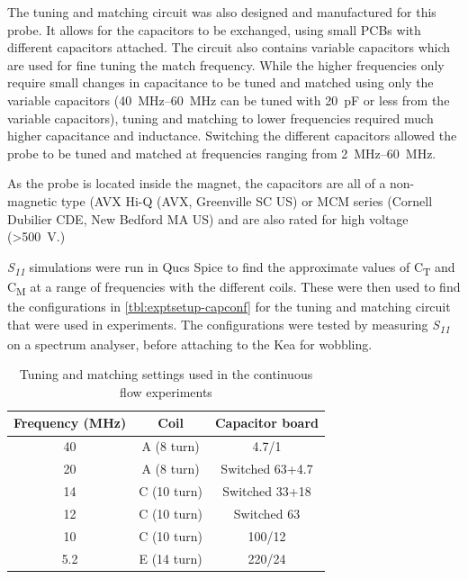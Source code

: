 The tuning and matching circuit was also designed and manufactured for this probe.
It allows for the capacitors to be exchanged, using small PCBs with different capacitors attached.
The circuit also contains variable capacitors which are used for fine tuning the match frequency.
While the higher frequencies only require small changes in capacitance to be tuned and matched using only the variable capacitors (\SIrange[range-phrase = --]{40}{60}{MHz} can be tuned with \SI{20}{pF} or less from the variable capacitors), tuning and matching to lower frequencies required much higher capacitance and inductance.
Switching the different capacitors allowed the probe to be tuned and matched at frequencies ranging from \SIrange{2}{60}{\mega\hertz}.

As the probe is located inside the magnet, the capacitors are all of a non-magnetic type (AVX Hi-Q (AVX, Greenville SC US)  or MCM series (Cornell Dubilier CDE, New Bedford MA US) and are also rated for high voltage (\SI{>500}{V}.)

\textit{S\textsubscript{11}} simulations were run in Qucs Spice to find the approximate values of C\textsubscript{T} and C\textsubscript{M} at a range of frequencies with the different coils.
These were then used to find the configurations in \autoref{tbl:exptsetup-capconf} for the tuning and matching circuit that were used in experiments.
The configurations were tested by measuring \textit{S\textsubscript{11}} on a spectrum analyser, before attaching to the Kea for wobbling.

\begin{table}[ht]
\centering
\begin{tabular}{|c|c|c|}
\hline
Frequency (\si{MHz}) & Coil & Capacitor board\\
\hline
40 & A (8 turn) & 4.7/1 \\
20 & A (8 turn) & Switched 63+4.7 \\
14 & C (10 turn) & Switched 33+18 \\
12 & C (10 turn) & Switched 63 \\
10 & C (10 turn) & 100/12 \\
5.2 & E (14 turn) & 220/24 \\
\hline
\end{tabular}
\caption{Tuning and matching settings used in the continuous flow experiments}
\label{tbl:exptsetup-capconf}
\end{table}

